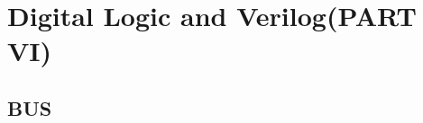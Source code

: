 \documentclass[12pt,openany, tikz,border=10pt]{book}
\begin{document}
\chapter{Digital Logic and Verilog(PART VI)}
\section{BUS}
\end{document}
